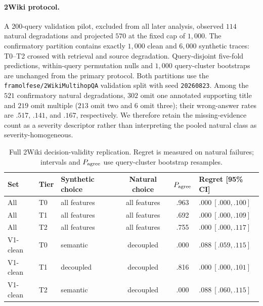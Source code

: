 \documentclass{article}
\begin{document}
\paragraph{2Wiki protocol.} A 200-query validation pilot, excluded from all later analysis,
observed $114$ natural degradations and projected $570$ at the fixed cap of $1{,}000$. The
confirmatory partition contains exactly $1{,}000$ clean and $6{,}000$ synthetic traces:
T0--T2 crossed with retrieval and source degradation. Query-disjoint five-fold predictions,
within-query permutation nulls and $1{,}000$ query-cluster bootstraps are unchanged from the
primary protocol. Both partitions use the \texttt{framolfese/2WikiMultihopQA} validation
split with seed \texttt{20260823}. Among the $521$ confirmatory natural degradations, $302$
omit one annotated supporting title and $219$ omit multiple ($213$ omit two and $6$ omit
three); their wrong-answer rates are $.517$, $.141$, and $.167$, respectively. We therefore
retain the missing-evidence count as a severity descriptor rather than interpreting the
pooled natural class as severity-homogeneous.

\begin{table}[h]
\centering\scriptsize
\caption{Full 2Wiki decision-validity replication. Regret is measured on natural failures;
intervals and $P_{\rm agree}$ use query-cluster bootstrap resamples.}
\label{tab:2wiki-v4}
\begin{tabular}{@{}lllccl@{}}
\toprule
Set & Tier & Synthetic choice & Natural choice & $P_{\rm agree}$ & Regret [95\% CI] \\
\midrule
All & T0 & all features & all features & .963 & $.000\ [.000,.100]$ \\
All & T1 & all features & all features & .692 & $.000\ [.000,.109]$ \\
All & T2 & all features & all features & .755 & $.000\ [.000,.117]$ \\
V1-clean & T0 & semantic & decoupled & .000 & $.088\ [.059,.115]$ \\
V1-clean & T1 & decoupled & decoupled & .816 & $.000\ [.000,.101]$ \\
V1-clean & T2 & semantic & decoupled & .000 & $.088\ [.060,.115]$ \\
\bottomrule
\end{tabular}
\end{table}
\end{document}
